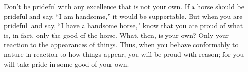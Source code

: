Don't be prideful with any excellence that is not your own. If
a horse should be prideful and say, ``I am handsome,'' it would be
supportable. But when you are prideful, and say, ``I have a handsome
horse,'' know that you are proud of what is, in fact, only the good
of the horse. What, then, is your own? Only your reaction to the appearances
of things. Thus, when you behave conformably to nature in reaction
to how things appear, you will be proud with reason; for you will
take pride in some good of your own. 
